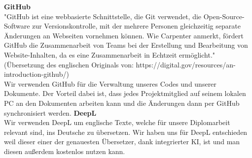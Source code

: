 \documentclass[]{article}
\begin{document}
\vspace{4mm}\newline
\textbf{GitHub} \\
"GitHub ist eine webbasierte Schnittstelle, die Git verwendet, die Open-Source-Software zur Versionskontrolle, mit der mehrere Personen gleichzeitig separate Änderungen an Webseiten vornehmen können. Wie Carpenter anmerkt, fördert GitHub die Zusammenarbeit von Teams bei der Erstellung und Bearbeitung von Website-Inhalten, da es eine Zusammenarbeit in Echtzeit ermöglicht." (Übersetzung des englischen Originals von: https://digital.gov/resources/an-introduction-github/) \\
Wir verwenden GitHub für die Verwaltung unseres Codes und unserer Dokumente. Der Vorteil dabei ist, dass jedes Projektmitglied auf seinem lokalen PC an den Dokumenten arbeiten kann und die Änderungen dann per GitHub synchronisiert werden.
\vspace{4mm}\newline
\textbf{DeepL} \\
Wir verwenden DeepL um englische Texte, welche für unsere Diplomarbeit relevant sind, ins Deutsche zu übersetzen. Wir haben uns für DeepL entschieden weil dieser einer der genauesten Übersetzer, dank integrierter KI, ist und man diesen außerdem kostenlos nutzen kann.
\end{document}
